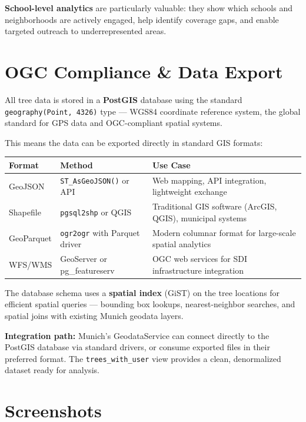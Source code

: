 \documentclass[11pt,a4paper]{article}
\begin{document}
\textbf{School-level analytics} are particularly valuable: they show which schools and neighborhoods are actively engaged, help identify coverage gaps, and enable targeted outreach to underrepresented areas.

\section{OGC Compliance \& Data Export}

All tree data is stored in a \textbf{PostGIS} database using the standard \texttt{geography(Point, 4326)} type --- WGS84 coordinate reference system, the global standard for GPS data and OGC-compliant spatial systems.

This means the data can be exported directly in standard GIS formats:

\begin{center}
\begin{tabularx}{\textwidth}{l l X}
\toprule
\textbf{Format} & \textbf{Method} & \textbf{Use Case} \\
\midrule
GeoJSON & \texttt{ST\_AsGeoJSON()} or API & Web mapping, API integration, lightweight exchange \\
Shapefile & \texttt{pgsql2shp} or QGIS & Traditional GIS software (ArcGIS, QGIS), municipal systems \\
GeoParquet & \texttt{ogr2ogr} with Parquet driver & Modern columnar format for large-scale spatial analytics \\
WFS/WMS & GeoServer or pg\_featureserv & OGC web services for SDI infrastructure integration \\
\bottomrule
\end{tabularx}
\end{center}

The database schema uses a \textbf{spatial index} (GiST) on the tree locations for efficient spatial queries --- bounding box lookups, nearest-neighbor searches, and spatial joins with existing Munich geodata layers.

\textbf{Integration path:} Munich's GeodataService can connect directly to the PostGIS database via standard drivers, or consume exported files in their preferred format. The \texttt{trees\_with\_user} view provides a clean, denormalized dataset ready for analysis.

\section{Screenshots}
\end{document}
